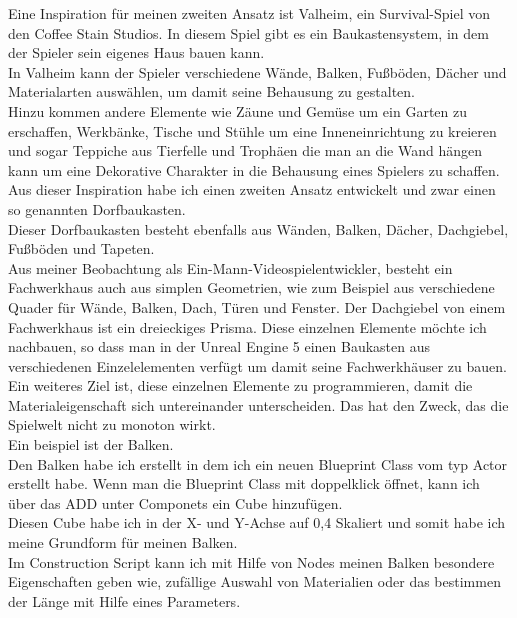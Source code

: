 Eine Inspiration für meinen zweiten Ansatz ist Valheim, ein Survival-Spiel von den Coffee Stain Studios. In diesem Spiel gibt es ein Baukastensystem, in dem der Spieler sein eigenes Haus bauen kann.
\\
In Valheim kann der Spieler verschiedene Wände, Balken, Fußböden, Dächer und Materialarten auswählen, um damit seine Behausung zu gestalten.
\\
Hinzu kommen andere Elemente wie Zäune und Gemüse um ein Garten zu erschaffen, Werkbänke, Tische und Stühle um eine Inneneinrichtung zu kreieren und sogar Teppiche aus Tierfelle und Trophäen die man an die Wand hängen kann um eine Dekorative Charakter in die Behausung eines Spielers zu schaffen.
\\
Aus dieser Inspiration habe ich einen zweiten Ansatz entwickelt und zwar einen so genannten Dorfbaukasten.
\\
Dieser Dorfbaukasten besteht ebenfalls aus Wänden, Balken, Dächer, Dachgiebel, Fußböden und Tapeten.
\\
Aus meiner Beobachtung als Ein-Mann-Videospielentwickler, besteht ein Fachwerkhaus auch aus simplen Geometrien, wie zum Beispiel aus verschiedene Quader für Wände, Balken, Dach, Türen und Fenster. Der Dachgiebel von einem Fachwerkhaus ist ein dreieckiges Prisma. Diese einzelnen Elemente möchte ich nachbauen, so dass man in der Unreal Engine 5 einen Baukasten aus verschiedenen Einzelelementen verfügt um damit seine Fachwerkhäuser zu bauen. 
\\
Ein weiteres Ziel ist, diese einzelnen Elemente zu programmieren, damit die Materialeigenschaft sich untereinander unterscheiden. Das hat den Zweck, das die Spielwelt nicht zu monoton wirkt.
\\
Ein beispiel ist der Balken.
\\
Den Balken habe ich erstellt in dem ich ein neuen Blueprint Class vom typ Actor erstellt habe. Wenn man die Blueprint Class mit doppelklick öffnet, kann ich über das ADD unter Componets ein Cube hinzufügen.
\\
Diesen Cube habe ich in der X- und Y-Achse auf 0,4 Skaliert und somit habe ich meine Grundform für meinen Balken.
\\
Im Construction Script kann ich mit Hilfe von Nodes meinen Balken besondere Eigenschaften geben wie, zufällige Auswahl von Materialien oder das bestimmen der Länge mit Hilfe eines Parameters.
\\


